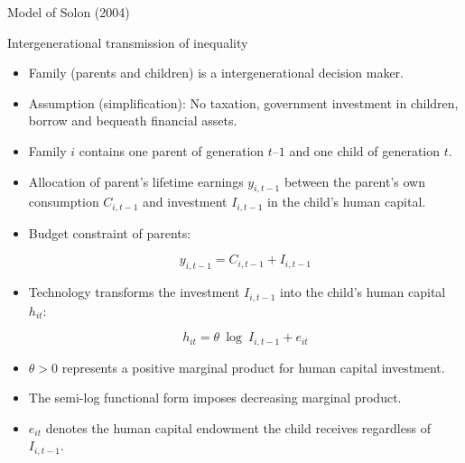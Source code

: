 \documentclass{beamer}
\begin{document}
\setcounter{equation}{0}
\begin{frame}[label=SolonModell]{Model of Solon (2004)}
\begin{block}{Intergenerational transmission of inequality}
\begin{itemize}
\item \footnotesize Family (parents and children) is a intergenerational decision maker.
\item \footnotesize Assumption (simplification): No taxation, government investment in children, borrow and bequeath financial assets.
\item \footnotesize Family $i$ contains one parent of generation $t–1$ and one child of generation $t$.
\item \footnotesize Allocation of parent’s lifetime earnings $y_{i,t-1}$ between the parent’s own consumption $C_{i,t-1}$ and investment $I_{i,t-1}$ in the child’s human capital.
\end{itemize}
\end{block}

\begin{itemize}
\item \footnotesize Budget constraint of parents: 

\begin{equation} \label{eq:Budget}
y_{i,t-1}=C_{i,t-1}+I_{i,t-1}
\end{equation}


\item \footnotesize Technology transforms the investment $I_{i,t-1}$ into the child’s human capital $h_{it}$:

\begin{equation} \label{eq: Technology}
h_{it}=\theta \ \log \ I_{i,t-1}+e_{it} 
\end{equation}

\item \tiny $\theta > 0$ represents a positive marginal product for human capital investment.
\item \tiny The semi-log functional form imposes decreasing marginal product.
\item \tiny $e_{it}$ denotes the human capital endowment the child receives regardless of $I_{i,t-1}$.
\end{itemize}
\end{frame}
\end{document}
